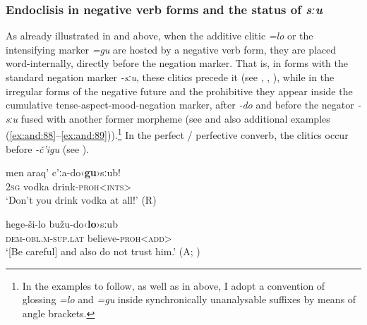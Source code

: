 \documentclass[output=paper,colorlinks=true, citecolor=brown]{langscibook}
\begin{document}
\subsubsection{Endoclisis in negative verb forms and the status of \textit{sːu}} \label{sec:and:4.6.3}

As already illustrated in  and  above, when the additive clitic \textit{=lo} or the intensifying marker \textit{=gu} are hosted by a negative verb form, they are placed word-internally, directly before the negation marker. That is, in forms with the standard negation marker \textit{{}-sːu}, these clitics precede it (see , , ), while in the irregular forms of the negative future and the prohibitive they appear inside the cumulative tense-aspect-mood-negation marker, after \textit{-do} and before the negator \textit{{}-sːu} fused with another former morpheme (see  and also additional examples (\ref{ex:and:88}--\ref{ex:and:89})).\footnote{In the examples to follow, as well as in  above, I adopt a convention of glossing \textit{=lo} and \textit{=gu} inside synchronically unanalysable suffixes by means of angle brackets.} In the perfect / perfective converb, the clitics occur before \textit{-č’igu} (see ). 

\ea 
    \label{ex:and:88}
    \gll men araq’ c’ːa-do‹\textbf{gu}›sːub!\\
          \textsc{2sg} vodka drink-\textsc{proh<ints>} \\
    \glt ‘Don’t you drink vodka at all!’ (R)
\z 

\ea
    \label{ex:and:89} 
    \gll  hege{}-ši-lo bužu-do‹\textbf{lo}›sːub\\
          \textsc{dem{}-obl.m-sup.lat} believe-\textsc{proh<add>} \\
    \glt ‘[Be careful] and also do not trust him.’ (A; )
\z 
\end{document}
